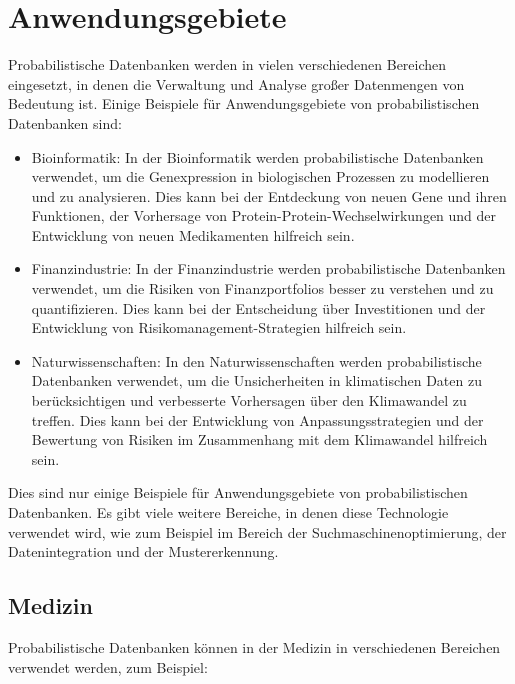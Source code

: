\chapter{Anwendungsgebiete}

Probabilistische Datenbanken werden in vielen verschiedenen Bereichen eingesetzt, in denen die Verwaltung und Analyse großer Datenmengen von Bedeutung ist. Einige Beispiele für Anwendungsgebiete von probabilistischen Datenbanken sind:

\begin{itemize}
	\item Bioinformatik: In der Bioinformatik werden probabilistische Datenbanken verwendet, um die Genexpression in biologischen Prozessen zu modellieren und zu analysieren. Dies kann bei der Entdeckung von neuen Gene und ihren Funktionen, der Vorhersage von Protein-Protein-Wechselwirkungen und der Entwicklung von neuen Medikamenten hilfreich sein.
	
	\item  Finanzindustrie: In der Finanzindustrie werden probabilistische Datenbanken verwendet, um die Risiken von Finanzportfolios besser zu verstehen und zu quantifizieren. Dies kann bei der Entscheidung über Investitionen und der Entwicklung von Risikomanagement-Strategien hilfreich sein.
	
	\item Naturwissenschaften: In den Naturwissenschaften werden probabilistische Datenbanken verwendet, um die Unsicherheiten in klimatischen Daten zu berücksichtigen und verbesserte Vorhersagen über den Klimawandel zu treffen. Dies kann bei der Entwicklung von Anpassungsstrategien und der Bewertung von Risiken im Zusammenhang mit dem Klimawandel hilfreich sein.
\end{itemize}

Dies sind nur einige Beispiele für Anwendungsgebiete von probabilistischen Datenbanken. Es gibt viele weitere Bereiche, in denen diese Technologie verwendet wird, wie zum Beispiel im Bereich der Suchmaschinenoptimierung, der Datenintegration und der Mustererkennung.
\clearpage 

\section{Medizin}
Probabilistische Datenbanken können in der Medizin in verschiedenen Bereichen verwendet werden, zum Beispiel:

